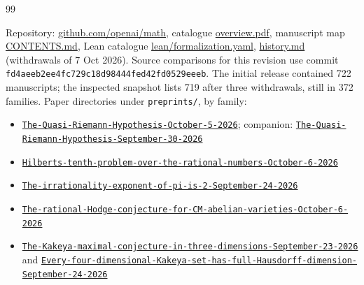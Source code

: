 \documentclass[11pt]{article}
\begin{document}
\begin{thebibliography}{99}\small\raggedright
{}
 Repository: \href{https://github.com/openai/math}{github.com/openai/math}, catalogue \href{https://github.com/openai/math/blob/fd4aeeb2ee4fc729c18d98444fed42fd0529eeeb/overview.pdf}{overview.pdf}, manuscript map \href{https://github.com/openai/math/blob/fd4aeeb2ee4fc729c18d98444fed42fd0529eeeb/CONTENTS.md}{CONTENTS.md}, Lean catalogue \href{https://github.com/openai/math/blob/fd4aeeb2ee4fc729c18d98444fed42fd0529eeeb/lean/formalization.yaml}{lean/formalization.yaml}, \href{https://github.com/openai/math/blob/fd4aeeb2ee4fc729c18d98444fed42fd0529eeeb/history.md}{history.md} (withdrawals of 7 Oct 2026). Source comparisons for this revision use commit \nolinkurl{fd4aeeb2ee4fc729c18d98444fed42fd0529eeeb}. The initial release contained 722 manuscripts; the inspected snapshot lists 719 after three withdrawals, still in 372 families.
 Paper directories under \texttt{preprints/\allowbreak{}}, by family:\begin{itemize}[nosep,leftmargin=2.2em,labelsep=0.5em]\item[003] {\small \href{https://github.com/openai/math/tree/fd4aeeb2ee4fc729c18d98444fed42fd0529eeeb/preprints/The-Quasi-Riemann-Hypothesis-October-5-2026}{\nolinkurl{The-Quasi-Riemann-Hypothesis-October-5-2026}}; companion: \href{https://github.com/openai/math/tree/fd4aeeb2ee4fc729c18d98444fed42fd0529eeeb/preprints/The-Quasi-Riemann-Hypothesis-September-30-2026}{\nolinkurl{The-Quasi-Riemann-Hypothesis-September-30-2026}}}
\item[004] {\small \href{https://github.com/openai/math/tree/fd4aeeb2ee4fc729c18d98444fed42fd0529eeeb/preprints/Hilberts-tenth-problem-over-the-rational-numbers-October-6-2026}{\nolinkurl{Hilberts-tenth-problem-over-the-rational-numbers-October-6-2026}}}
\item[017] {\small \href{https://github.com/openai/math/tree/fd4aeeb2ee4fc729c18d98444fed42fd0529eeeb/preprints/The-irrationality-exponent-of-pi-is-2-September-24-2026}{\nolinkurl{The-irrationality-exponent-of-pi-is-2-September-24-2026}}}
\item[032] {\small \href{https://github.com/openai/math/tree/fd4aeeb2ee4fc729c18d98444fed42fd0529eeeb/preprints/The-rational-Hodge-conjecture-for-CM-abelian-varieties-October-6-2026}{\nolinkurl{The-rational-Hodge-conjecture-for-CM-abelian-varieties-October-6-2026}}}
\item[074] {\small \href{https://github.com/openai/math/tree/fd4aeeb2ee4fc729c18d98444fed42fd0529eeeb/preprints/The-Kakeya-maximal-conjecture-in-three-dimensions-September-23-2026}{\nolinkurl{The-Kakeya-maximal-conjecture-in-three-dimensions-September-23-2026}} and \href{https://github.com/openai/math/tree/fd4aeeb2ee4fc729c18d98444fed42fd0529eeeb/preprints/Every-four-dimensional-Kakeya-set-has-full-Hausdorff-dimension-September-24-2026}{\nolinkurl{Every-four-dimensional-Kakeya-set-has-full-Hausdorff-dimension-September-24-2026}}}

\end{itemize}
\end{thebibliography}
\end{document}
